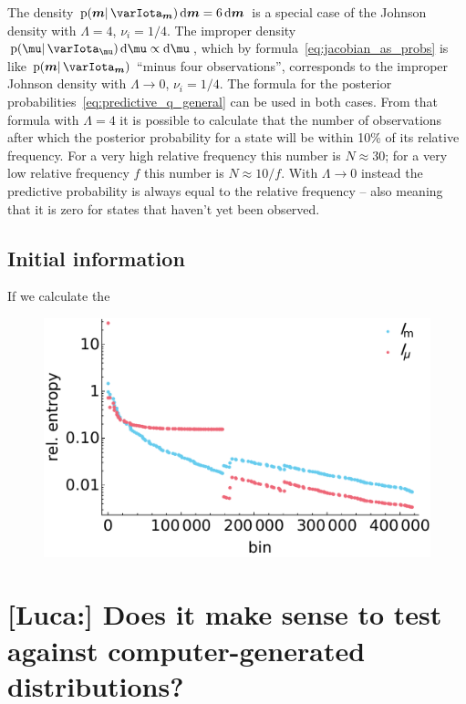 \documentclass[\ifafour a4paper,12pt,\else a5paper,10pt,\fi%
onecolumn,oneside,article,%
british%
]{memoir}
\theoremstyle{remark}
\theoremstyle{innote}
\newcommand*{\di}{\mathrm{d}}%
\newcommand*{\pf}{\mathrm{p}}%
\renewcommand*{\|}{\mathpunct{|}}
\newcommand*{\yI}{\varIota}
\newcommand*{\yth}{\bm{\mu}}
\newcommand*{\yt}{\bm{m}}
\newcommand*{\yIth}{\yI_{\yth}}
\newcommand*{\yIt}{\yI_{\yt}}
\newcommand*{\yN}{\varLambda}
\newcommand*{\ynn}{\nu}
\begin{document}
\bigskip

The density $\pf(\yt \| \yIt)\,\di\yt = 6\,\di\yt$ is a special case of the
Johnson density with $\yN=4$, $\ynn_i=1/4$. The improper density
$\pf(\yth \| \yIth)\,\di\yth \propto \di\yth$, which by
formula~\eqref{eq:jacobian_as_probs} is like $\pf(\yt \| \yIt)$
\enquote{minus four observations}, corresponds to the improper Johnson
density with $\yN\to 0$, $\ynn_i=1/4$. The formula for the posterior
probabilities~\eqref{eq:predictive_q_general} can be used in both cases.
From that formula with $\yN=4$ it is possible to calculate that the number
of observations after which the posterior probability for a state will be
within 10\% of its relative frequency. For a very high relative frequency
this number is $N\approx 30$; for a very low relative frequency $f$ this
number is $N\approx 10/f$. With $\yN \to 0$ instead the predictive
probability is always equal to the relative frequency -- also meaning that
it is zero for states that haven't yet been observed.


\subsection{Initial information}
\label{sec:initial_info}

If we calculate the 

\begin{figure}%
  \centering\includegraphics[width=\linewidth]{comp_priors.pdf}\\
  \caption{}
  \label{fig:comp_priors}
\end{figure}%



\section{[Luca:] Does it make sense to test against computer-generated
  distributions?}
\label{sec:makes_no_sense}
\end{document}
